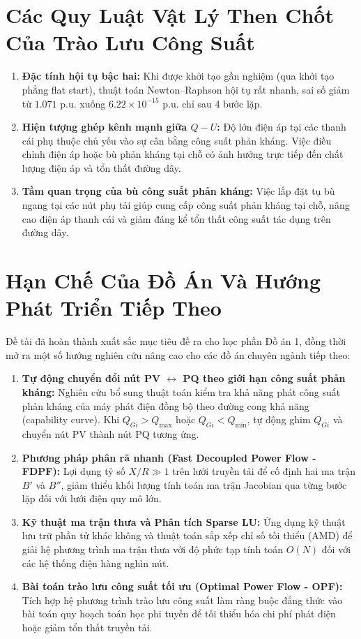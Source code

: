\documentclass[12pt,a4paper,oneside]{report}
\begin{document}
\section{Các Quy Luật Vật Lý Then Chốt Của Trào Lưu Công Suất}
\begin{enumerate}
    \item \textbf{Đặc tính hội tụ bậc hai:} Khi được khởi tạo gần nghiệm (qua khởi tạo phẳng flat start), thuật toán Newton--Raphson hội tụ rất nhanh, sai số giảm từ $1.071\text{ p.u.}$ xuống $6.22 \times 10^{-15}\text{ p.u.}$ chỉ sau 4 bước lặp.
    \item \textbf{Hiện tượng ghép kênh mạnh giữa $Q-U$:} Độ lớn điện áp tại các thanh cái phụ thuộc chủ yếu vào sự cân bằng công suất phản kháng. Việc điều chỉnh điện áp hoặc bù phản kháng tại chỗ có ảnh hưởng trực tiếp đến chất lượng điện áp và tổn thất đường dây.
    \item \textbf{Tầm quan trọng của bù công suất phản kháng:} Việc lắp đặt tụ bù ngang tại các nút phụ tải giúp cung cấp công suất phản kháng tại chỗ, nâng cao điện áp thanh cái và giảm đáng kể tổn thất công suất tác dụng trên đường dây.
\end{enumerate}

\section{Hạn Chế Của Đồ Án Và Hướng Phát Triển Tiếp Theo}
Đề tài đã hoàn thành xuất sắc mục tiêu đề ra cho học phần Đồ án 1, đồng thời mở ra một số hướng nghiên cứu nâng cao cho các đồ án chuyên ngành tiếp theo:
\begin{enumerate}
    \item \textbf{Tự động chuyển đổi nút PV $\leftrightarrow$ PQ theo giới hạn công suất phản kháng:} Nghiên cứu bổ sung thuật toán kiểm tra khả năng phát công suất phản kháng của máy phát điện đồng bộ theo đường cong khả năng (capability curve). Khi $Q_{Gi} > Q_{\max}$ hoặc $Q_{Gi} < Q_{\min}$, tự động ghim $Q_{Gi}$ và chuyển nút PV thành nút PQ tương ứng.
    \item \textbf{Phương pháp phân rã nhanh (Fast Decoupled Power Flow - FDPF):} Lợi dụng tỷ số $X/R \gg 1$ trên lưới truyền tải để cố định hai ma trận $B'$ và $B''$, giảm thiểu khối lượng tính toán ma trận Jacobian qua từng bước lặp đối với lưới điện quy mô lớn.
    \item \textbf{Kỹ thuật ma trận thưa và Phân tích Sparse LU:} Ứng dụng kỹ thuật lưu trữ phần tử khác không và thuật toán sắp xếp chỉ số tối thiểu (AMD) để giải hệ phương trình ma trận thưa với độ phức tạp tính toán $O(N)$ đối với các hệ thống điện hàng nghìn nút.
    \item \textbf{Bài toán trào lưu công suất tối ưu (Optimal Power Flow - OPF):} Tích hợp hệ phương trình trào lưu công suất làm ràng buộc đẳng thức vào bài toán quy hoạch toán học phi tuyến để tối thiểu hóa chi phí phát điện hoặc giảm tổn thất truyền tải.
\end{enumerate}
\end{document}
